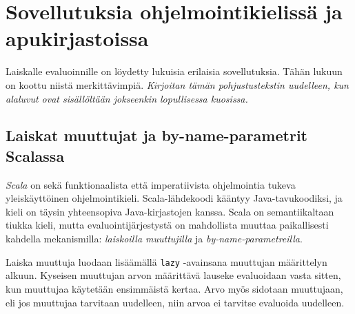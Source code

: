 
\section{Sovellutuksia ohjelmointikielissä ja apukirjastoissa}\label{sovellutuksia}

Laiskalle evaluoinnille on löydetty lukuisia erilaisia sovellutuksia. Tähän lukuun on koottu niistä merkittävimpiä. \textit{Kirjoitan tämän pohjustustekstin uudelleen, kun alaluvut ovat sisällöltään jokseenkin lopullisessa kuosissa.}

\subsection{Laiskat muuttujat ja by-name-parametrit Scalassa}

\textit{Scala} on sekä funktionaalista että imperatiivista ohjelmointia tukeva yleiskäyttöinen ohjelmointikieli. Scala-lähdekoodi kääntyy Java-tavukoodiksi, ja kieli on täysin yhteensopiva Java-kirjastojen kanssa. Scala on semantiikaltaan tiukka kieli, mutta evaluointijärjestystä on mahdollista muuttaa paikallisesti kahdella mekanismilla: \textit{laiskoilla muuttujilla} ja \textit{by-name-parametreilla}.

Laiska muuttuja luodaan lisäämällä \verb!lazy! -avainsana muuttujan määrittelyn alkuun. Kyseisen muuttujan arvon määrittävä lauseke evaluoidaan vasta sitten, kun muuttujaa käytetään ensimmäistä kertaa. Arvo myös sidotaan muuttujaan, eli jos muuttujaa tarvitaan uudelleen, niin arvoa ei tarvitse evaluoida uudelleen.

